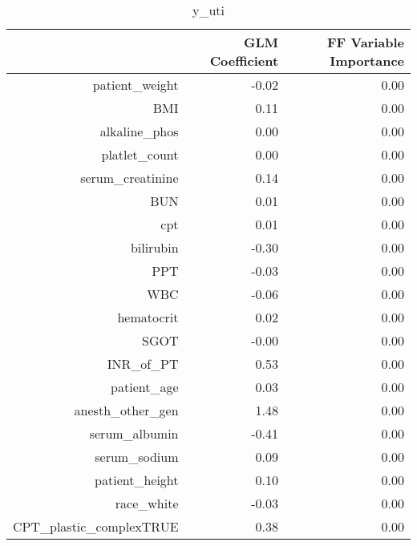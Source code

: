 \begin{table}[ht]
\centering
\begin{tabular}{rrr}
  \hline
 & GLM Coefficient & FF Variable Importance \\ 
  \hline
patient\_weight & -0.02 & 0.00 \\ 
  BMI & 0.11 & 0.00 \\ 
  alkaline\_phos & 0.00 & 0.00 \\ 
  platlet\_count & 0.00 & 0.00 \\ 
  serum\_creatinine & 0.14 & 0.00 \\ 
  BUN & 0.01 & 0.00 \\ 
  cpt & 0.01 & 0.00 \\ 
  bilirubin & -0.30 & 0.00 \\ 
  PPT & -0.03 & 0.00 \\ 
  WBC & -0.06 & 0.00 \\ 
  hematocrit & 0.02 & 0.00 \\ 
  SGOT & -0.00 & 0.00 \\ 
  INR\_of\_PT & 0.53 & 0.00 \\ 
  patient\_age & 0.03 & 0.00 \\ 
  anesth\_other\_gen & 1.48 & 0.00 \\ 
  serum\_albumin & -0.41 & 0.00 \\ 
  serum\_sodium & 0.09 & 0.00 \\ 
  patient\_height & 0.10 & 0.00 \\ 
  race\_white & -0.03 & 0.00 \\ 
  CPT\_plastic\_complexTRUE & 0.38 & 0.00 \\ 
   \hline
\end{tabular}
\caption{y_uti} 
\end{table}

